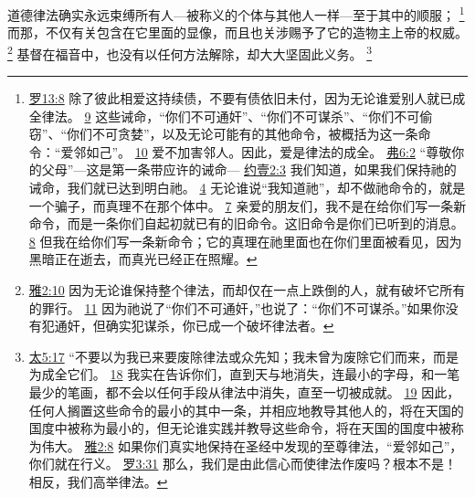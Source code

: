 \documentclass[12pt, a4paper, oneside]{ctexart}
\newcounter{parnum}[section]
\newcommand{\N}{%
   \noindent\refstepcounter{parnum}%
    \makebox[\parindent][l]{\textbf{\arabic{parnum}.}}}
\begin{document}
\N 道德律法确实永远束缚所有人---被称义的个体与其他人一样---至于其中的顺服；
	\footnote {
		\href{https://biblehub.com/romans/13-8.htm}{罗13:8} 除了彼此相爱这持续债，不要有债依旧未付，因为无论谁爱别人就已成全律法。
		\href{https://biblehub.com/romans/13-9.htm}{9} 这些诫命，“你们不可通奸”、“你们不可谋杀”、“你们不可偷窃”、“你们不可贪婪”，以及无论可能有的其他命令，被概括为这一条命令：“爱邻如己”。
		\href{https://biblehub.com/romans/13-10.htm}{10} 爱不加害邻人。因此，爱是律法的成全。
		\href{https://biblehub.com/ephesians/6-2.htm}{弗6:2} “尊敬你的父母”---这是第一条带应许的诫命---
		\href{https://biblehub.com/1_john/2-3.htm}{约壹2:3} 我们知道，如果我们保持祂的诫命，我们就已达到明白祂。
		\href{https://biblehub.com/1_john/2-4.htm}{4} 无论谁说“我知道祂”，却不做祂命令的，就是一个骗子，而真理不在那个体中。
		\href{https://biblehub.com/1_john/2-7.htm}{7} 亲爱的朋友们，我不是在给你们写一条新命令，而是一条你们自起初就已有的旧命令。这旧命令是你们已听到的消息。
		\href{https://biblehub.com/1_john/2-8.htm}{8} 但我在给你们写一条新命令；它的真理在祂里面也在你们里面被看见，因为黑暗正在逝去，而真光已经正在照耀。
	}
	而那，不仅有关包含在它里面的显像，而且也关涉赐予了它的造物主上帝的权威。
	\footnote {
		\href{https://biblehub.com/james/2-10.htm}{雅2:10} 因为无论谁保持整个律法，而却仅在一点上跌倒的人，就有破坏它所有的罪行。
		\href{https://biblehub.com/james/2-11.htm}{11} 因为祂说了“你们不可通奸，”也说了：“你们不可谋杀。”如果你没有犯通奸，但确实犯谋杀，你已成一个破坏律法者。
	}
	基督在福音中，也没有以任何方法解除，却大大坚固此义务。
	\footnote {
		\href{https://biblehub.com/matthew/5-17.htm}{太5:17} “不要以为我已来要废除律法或众先知；我未曾为废除它们而来，而是为成全它们。
		\href{https://biblehub.com/matthew/5-18.htm}{18} 我实在告诉你们，直到天与地消失，连最小的字母，和一笔最少的笔画，都不会以任何手段从律法中消失，直至一切被成就。
		\href{https://biblehub.com/matthew/5-19.htm}{19} 因此，任何人搁置这些命令的最小的其中一条，并相应地教导其他人的，将在天国的国度中被称为最小的，但无论谁实践并教导这些命令，将在天国的国度中被称为伟大。
		\href{https://biblehub.com/james/2-8.htm}{雅2:8} 如果你们真实地保持在圣经中发现的至尊律法，“爱邻如己”，你们就在行义。
		\href{https://biblehub.com/romans/3-31.htm}{罗3:31} 那么，我们是由此信心而使律法作废吗？根本不是！相反，我们高举律法。
	}
\end{document}
